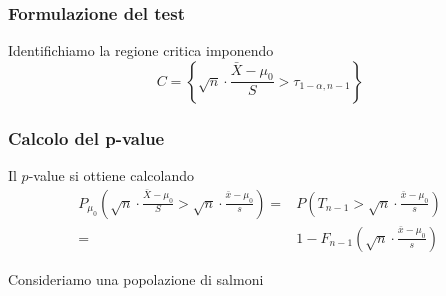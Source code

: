 \subsubsection{Formulazione del test}
Identifichiamo la regione critica imponendo
\[ C = \left\{ \sqrt{n} \cdot \frac{\bar{X} - \mu_0}{S} > \tau_{1 - \alpha, n-1} \right\} \]

\subsubsection{Calcolo del p-value}
Il $p$-value si ottiene calcolando
\begin{align*}
	P_{\mu_0} \left( \sqrt{n} \cdot \frac{\bar{X} - \mu_0}{S} >
	\sqrt{n} \cdot \frac{\bar{x} - \mu_0}{s} \right) = &
	P \left( T_{n-1} > \sqrt{n} \cdot \frac{\bar{x} - \mu_0}{s} \right) \\
	=                                                  &
	1 - F_{n-1} \left( \sqrt{n} \cdot \frac{\bar{x} - \mu_0}{s} \right)
\end{align*}

\begin{example}
	Consideriamo una popolazione di salmoni
\end{example}